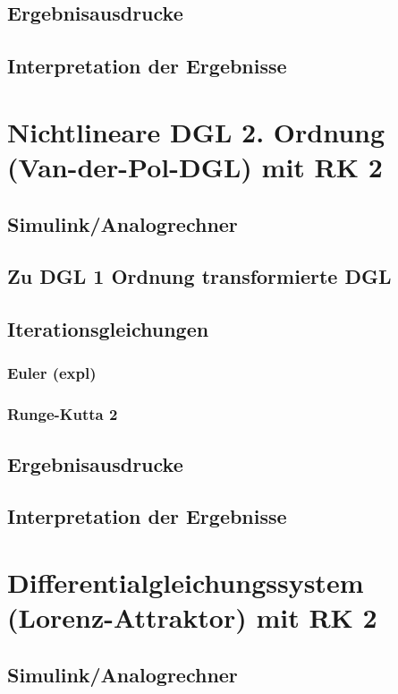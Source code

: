 \documentclass[10pt]{scrartcl}
\begin{document}
	\subsection{Ergebnisausdrucke}	
		
	\subsection{Interpretation der Ergebnisse}		
		

\section{Nichtlineare DGL 2. Ordnung (Van-der-Pol-DGL) mit RK 2}
	\subsection{Simulink/Analogrechner}
	
	\subsection{Zu DGL 1 Ordnung transformierte DGL}
	
	\subsection{Iterationsgleichungen}
		\subsubsection{Euler (expl)}	
	
		\subsubsection{Runge-Kutta 2}	
		
	\subsection{Ergebnisausdrucke}	
		
	\subsection{Interpretation der Ergebnisse}	
	
\section{Differentialgleichungssystem (Lorenz-Attraktor) mit RK 2}	
	\subsection{Simulink/Analogrechner}
	
\end{document}
